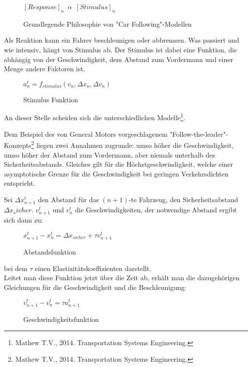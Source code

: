 \begin{figure}[H]
    \centering
    \( [Response]_n\enspace\alpha\enspace[Stimulus]_n \)
    \caption{Grundlegende Philosophie von "Car Following"-Modellen}
    \label{fig:basic_principle_of_car_following_models}
\end{figure}

Als Reaktion kann ein Fahrer beschleunigen oder abbremsen. Was passiert und wie intensiv, hängt von Stimulus ab. Der Stimulus ist dabei eine Funktion, die abhängig von der Geschwindigkeit, dem Abstand zum Vordermann und einer Menge andere Faktoren ist. 

\begin{figure}[H]
    \centering
    \( a^t_n = f_{stimulus} (v_n, \Delta{x_n}, \Delta{v}_n) \)
    \caption{Stimulus Funktion}
    \label{fig:stimulus_function}
\end{figure}

An dieser Stelle scheiden sich die unterschiedlichen Modelle\footnote{Mathew T.V., 2014. Transportation Systems Engineering.}.

Dem Beispiel des von General Motors vorgeschlagenem "Follow-the-leader"-Konzepts\footnote{Mathew T.V., 2014. Transportation Systems Engineering.} liegen zwei Annahmen zugrunde: umso höher die Geschwindigkeit, umso höher der Abstand zum Vordermann, aber niemals unterhalb des Sicherheitsabstands. Gleiches gilt für die Höchstgeschwindigkeit, welche einer asymptotische Grenze für die Geschwindigkeit bei geringen Verkehrsdichten entspricht.

Sei \(\Delta{x^t_{n+1}}\) den Abstand für das \( (n+1) \)-te Fahrzeug, den Sicherheitsabstand \(\Delta{x}_sicher\). \(v_{n+1}^t\) und \(v_n^t\) die Geschwindigkeiten, der notwendige Abstand ergibt sich dann zu:

\begin{figure}[H]
    \centering
    \( x^t_{n+1} - x^t_n = \Delta{x_{sicher}} + \tau{v^t_{n+1}} \)
    \caption{Abstandsfunktion}
    \label{fig:distance_function}
\end{figure}

bei dem \( \tau \) einen Elastizitätskoeffizienten darstellt. \\

Leitet man diese Funktion jetzt über die Zeit ab, erhält man die dazugehörigen Gleichungen für die Geschwindigkeit und die Beschleunigung:

\begin{figure}[H]
    \centering
    \( v^t_{n+1} - v^t_n = \tau{a^t_{n+1}} \)
    \caption{Geschwindigkeitsfunktion}
    \label{fig:speed_function}
\end{figure}


